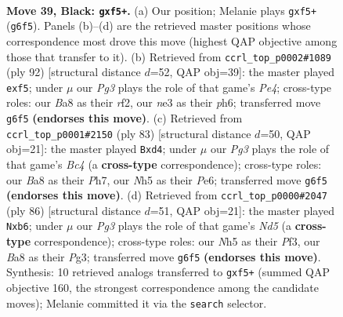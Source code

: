\documentclass[11pt]{article}
\begin{document}
\clearpage

\begin{figure}[p]\centering
\begin{subfigure}{0.46\textwidth}\centering
\resizebox{\linewidth}{!}{%
\newchessgame
\chessboard[
  setfen={b5k1/P4p2/6p1/4PN1n/6K1/R3N2P/1r6/8 b - - 14 39},
  showmover=false,
  pgfstyle=straightmove, color=movearrow, markmove={g6-f5}
]}
\caption{}
\end{subfigure}\hfill
\begin{subfigure}{0.46\textwidth}\centering
\resizebox{\linewidth}{!}{%
\newchessgame
\chessboard[
  setfen={1R6/5k2/4Np1p/5np1/4P3/2KP4/5r2/8 w - - 0 47},
  showmover=false,
  pgfstyle=straightmove, color=movearrow, markmove={e4-f5}
]}
\caption{}
\end{subfigure}
\\[4pt]
\begin{subfigure}{0.46\textwidth}\centering
\resizebox{\linewidth}{!}{%
\newchessgame
\chessboard[
  setfen={8/6kp/4p3/pNb1P2p/P2NK3/7P/1n4P1/8 b - - 2 42},
  showmover=false,
  pgfstyle=straightmove, color=movearrow, markmove={c5-d4}
]}
\caption{}
\end{subfigure}\hfill
\begin{subfigure}{0.46\textwidth}\centering
\resizebox{\linewidth}{!}{%
\newchessgame
\chessboard[
  setfen={8/5ppk/1r3n1p/3N4/8/5PP1/5P2/6K1 w - - 0 44},
  showmover=false,
  pgfstyle=straightmove, color=movearrow, markmove={d5-b6}
]}
\caption{}
\end{subfigure}
\caption{\textbf{Move 39, Black: \texttt{gxf5+}.} (a) Our position; Melanie plays \texttt{gxf5+} (\texttt{g6f5}). Panels (b)--(d) are the retrieved master positions whose correspondence most drove this move (highest QAP objective among those that transfer to it). (b) Retrieved from \texttt{ccrl\_top\_p0002\#1089} (ply 92) [structural distance $d$=52, QAP obj=39]: the master played \texttt{exf5}; under $\mu$ our \emph{Pg3} plays the role of that game's \emph{Pe4}; cross-type roles: our \emph{B}a8 as their \emph{r}f2, our \emph{n}e3 as their \emph{p}h6; transferred move \texttt{g6f5} \textbf{(endorses this move)}. (c) Retrieved from \texttt{ccrl\_top\_p0001\#2150} (ply 83) [structural distance $d$=50, QAP obj=21]: the master played \texttt{Bxd4}; under $\mu$ our \emph{Pg3} plays the role of that game's \emph{Bc4} (a \textbf{cross-type} correspondence); cross-type roles: our \emph{B}a8 as their \emph{P}h7, our \emph{N}h5 as their \emph{P}e6; transferred move \texttt{g6f5} \textbf{(endorses this move)}. (d) Retrieved from \texttt{ccrl\_top\_p0000\#2047} (ply 86) [structural distance $d$=51, QAP obj=21]: the master played \texttt{Nxb6}; under $\mu$ our \emph{Pg3} plays the role of that game's \emph{Nd5} (a \textbf{cross-type} correspondence); cross-type roles: our \emph{N}h5 as their \emph{P}f3, our \emph{B}a8 as their \emph{P}g3; transferred move \texttt{g6f5} \textbf{(endorses this move)}. Synthesis: 10 retrieved analogs transferred to \texttt{gxf5+} (summed QAP objective 160, the strongest correspondence among the candidate moves); Melanie committed it via the \texttt{search} selector.}
\label{fig:thought-m77}
\end{figure}
\end{document}

